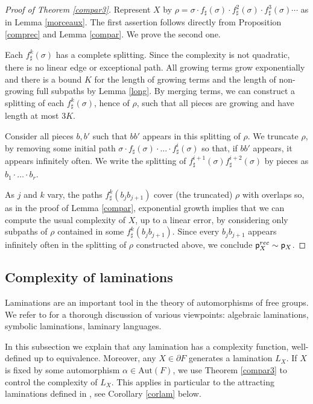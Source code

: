 \documentclass[11pt]{amsart}
\theoremstyle{remark}
\newcommand{\Aut} {{\mathrm{Aut}}}
\newcommand{\pr}{\cp^{rec}}
\newcommand{\cp}{{\sf  p}}
\newcommand{\bo}{\partial}
\begin{document}
\begin{proof}[Proof of Theorem \ref{compar3}]
Represent $X$ by 
$\rho=\sigma \cdot f_\sharp (\sigma)\cdot f^2_\sharp(\sigma)\cdot f^3_\sharp(\sigma)\cdots$ 
as in Lemma \ref{morceaux}. 
The first assertion follows directly from Proposition \ref{comprec} and Lemma \ref{compar}. We prove the second one.



Each $f^k_\sharp(\sigma)$ has a complete splitting. Since the complexity is not quadratic, there is no linear edge or exceptional path. All growing terms grow exponentially and there is a bound $K$ for the length of growing terms and the length of non-growing full subpaths  by Lemma \ref{long}. By merging terms, we can construct a splitting of each $f^k_\sharp(\sigma)$, hence of $\rho$,  such that all pieces are growing and have length at most $3K$. 

Consider all   pieces $b,b'$ such that $bb'$   appears in this splitting of $\rho$. We truncate $\rho$, by removing some initial path 
$ \sigma \cdot f_\sharp (\sigma)\cdot {\dots} \cdot f^i _\sharp(\sigma)$
so  that, if $bb'$ appears, it appears infinitely often. We   write the splitting of $ f^{i +1}_\sharp(\sigma) f^{i+2} _{\sharp}(\sigma)$ by pieces as 
$b_1\cdot {\dots} \cdot b_r$. 

As $j$ and $k$ vary, the paths $f^k_\sharp(b_jb_{j+1})$ cover (the truncated) $\rho$ with overlaps so, as in the proof of Lemma \ref{compar}, exponential growth implies that we can compute the usual complexity of $X$, up to a linear error, by considering only subpaths of $\rho$ contained in some $f^k_\sharp(b_jb_{j+1})$. Since every $b_jb_{j+1}$ appears infinitely often in  the splitting of $\rho$ constructed above, we conclude $  \pr_X\sim \cp_X$. 
 \end{proof}
 

\subsection{Complexity of laminations} \label{lami}

Laminations are an important tool in the theory of automorphisms of free groups. We refer to \cite{CHL1} for a thorough discussion of   various viewpoints: algebraic laminations, symbolic laminations, laminary languages. 

In this subsection we explain that any lamination has a complexity function, well-defined up to equivalence. Moreover, any $X\in\bo F$ generates a lamination $L_X$.  If $X$ is fixed by some automorphism $\alpha\in\Aut(F)$, we use Theorem  
\ref{compar3} to control the complexity of $L_X$. This applies in particular to the attracting laminations defined in \cite{Tits1},    see   Corollary \ref {corlam} below.
\end{document}
